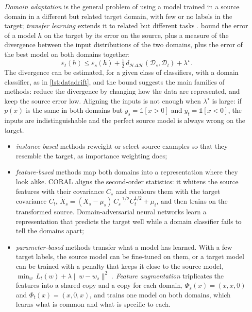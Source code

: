 \emph{Domain adaptation} is the general problem of using a model trained in a source domain in a different but related
target domain, with few or no labels in the target; \emph{transfer learning} extends it to related but different tasks
\citep{pan2010survey}. \citet{bendavid2010theory} bound the error of a model $h$ on the target by its error on the source, plus a
measure of the divergence between the input distributions of the two domains, plus the error of the best model on both
domains together:
\begin{equation}
  \varepsilon_t(h)\leq\varepsilon_s(h)+\tfrac12\,d_{\mathcal H\Delta\mathcal H}(\mathcal D_s,\mathcal D_t)+\lambda^\star .
\end{equation}
The divergence can be estimated, for a given class of classifiers, with a domain classifier, as in
\cref{lst:datadrift}, and the bound suggests the main families of methods: reduce the divergence by changing
how the data are represented, and keep the source error low. Aligning the inputs is not enough when
$\lambda^\star$ is large: if $p(x)$ is the same in both domains but $y_s=\mathbb 1[x>0]$ and $y_t=\mathbb 1[x<0]$, the
inputs are indistinguishable and the perfect source model is always wrong on the target.
\begin{itemize}
  \item \emph{instance-based} methods reweight or select source examples so that they resemble the target, as
        importance weighting does;
  \item \emph{feature-based} methods map both domains into a representation where they look alike. CORAL
        \citep{sun2016return} aligns the second-order statistics: it whitens the source features with their covariance
        $C_s$ and recolours them with the target covariance $C_t$, $\tilde X_s=(X_s-\mu_s)\,C_s^{-1/2}C_t^{1/2}+\mu_t$, and
        then trains on the transformed source. Domain-adversarial neural networks \citep{ganin2016domain} learn a
        representation that predicts the target well while a domain classifier fails to tell the domains apart;
  \item \emph{parameter-based} methods transfer what a model has learned. With a few target labels, the source model can
        be fine-tuned on them, or a target model can be trained with a penalty that keeps it close to the source model,
        $\min_w\,L_t(w)+\lambda\|w-w_s\|^2$ \citep{chelba2006adaptation}. \emph{Feature augmentation}
        \citep{daume2007frustratingly} triplicates the features into a shared copy and a copy for each domain,
        $\Phi_s(x)=(x,x,0)$ and $\Phi_t(x)=(x,0,x)$, and trains one model on both domains, which learns what is common and
        what is specific to each.
\end{itemize}
